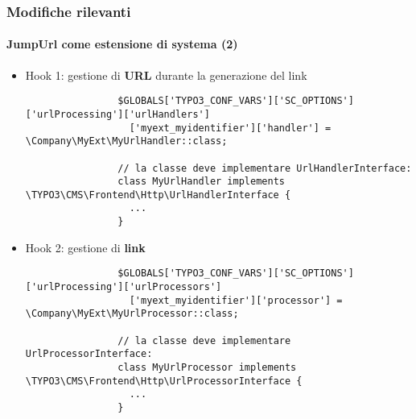 
\begin{frame}[fragile]
	\frametitle{Modifiche rilevanti}
	\framesubtitle{JumpUrl come estensione di systema (2)}

	\lstset{basicstyle=\tiny\ttfamily}

	\begin{itemize}

		\item Hook 1: gestione di \textbf{URL} durante la generazione del link

			\begin{lstlisting}
				$GLOBALS['TYPO3_CONF_VARS']['SC_OPTIONS']['urlProcessing']['urlHandlers']
				  ['myext_myidentifier']['handler'] = \Company\MyExt\MyUrlHandler::class;

				// la classe deve implementare UrlHandlerInterface:
				class MyUrlHandler implements \TYPO3\CMS\Frontend\Http\UrlHandlerInterface {
				  ...
				}
			\end{lstlisting}

		\item Hook 2: gestione di \textbf{link}

			\begin{lstlisting}
				$GLOBALS['TYPO3_CONF_VARS']['SC_OPTIONS']['urlProcessing']['urlProcessors']
				  ['myext_myidentifier']['processor'] = \Company\MyExt\MyUrlProcessor::class;

				// la classe deve implementare UrlProcessorInterface:
				class MyUrlProcessor implements \TYPO3\CMS\Frontend\Http\UrlProcessorInterface {
				  ...
				}
			\end{lstlisting}

	\end{itemize}

\end{frame}


